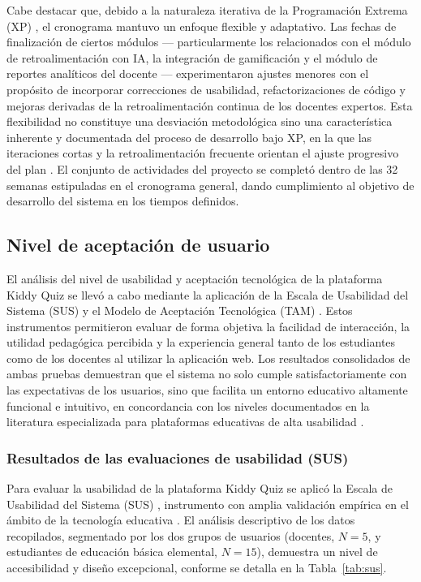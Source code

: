 Cabe destacar que, debido a la naturaleza iterativa de la Programación Extrema (XP) \cite{beck2004xp}, el cronograma mantuvo un enfoque flexible y adaptativo. Las fechas de finalización de ciertos módulos --- particularmente los relacionados con el módulo de retroalimentación con IA, la integración de gamificación y el módulo de reportes analíticos del docente --- experimentaron ajustes menores con el propósito de incorporar correcciones de usabilidad, refactorizaciones de código y mejoras derivadas de la retroalimentación continua de los docentes expertos. Esta
flexibilidad no constituye una desviación metodológica sino una característica inherente y documentada del proceso de desarrollo bajo XP, en la que las iteraciones cortas y la retroalimentación frecuente orientan el ajuste progresivo del plan \cite{dyba2008agile,shrivastava2021xpreview}. El conjunto de actividades del proyecto se completó dentro de las 32 semanas estipuladas en el cronograma general, dando cumplimiento al objetivo de desarrollo del sistema en los tiempos definidos.

    \subsection{Nivel de aceptación de usuario}

El análisis del nivel de usabilidad y aceptación tecnológica de la plataforma Kiddy Quiz se llevó a cabo mediante la aplicación de la Escala de Usabilidad del Sistema (SUS) y el Modelo de Aceptación Tecnológica (TAM) \cite{brooke1996sus,davis1989tam}. Estos instrumentos permitieron evaluar de forma objetiva la facilidad de interacción, la utilidad pedagógica percibida y la experiencia general tanto de los estudiantes como de los docentes al utilizar la aplicación web. Los resultados consolidados de ambas pruebas demuestran que el sistema no solo cumple satisfactoriamente con las expectativas de los usuarios, sino que facilita un entorno educativo altamente funcional e intuitivo, en concordancia con los niveles documentados en la literatura especializada para plataformas educativas de alta usabilidad \cite{vlachogianni2022sus}.

\subsubsection{Resultados de las evaluaciones de usabilidad (SUS)}

Para evaluar la usabilidad de la plataforma Kiddy Quiz se aplicó la Escala de Usabilidad del Sistema (SUS) \cite{brooke1996sus}, instrumento con amplia validación empírica en el ámbito de la tecnología educativa \cite{vlachogianni2022sus}. El análisis descriptivo de los datos recopilados, segmentado por los dos grupos de usuarios (docentes, $N=5$, y estudiantes de educación básica elemental, $N=15$), demuestra un nivel de accesibilidad y diseño excepcional, conforme se detalla en la Tabla~\ref{tab:sus}.

